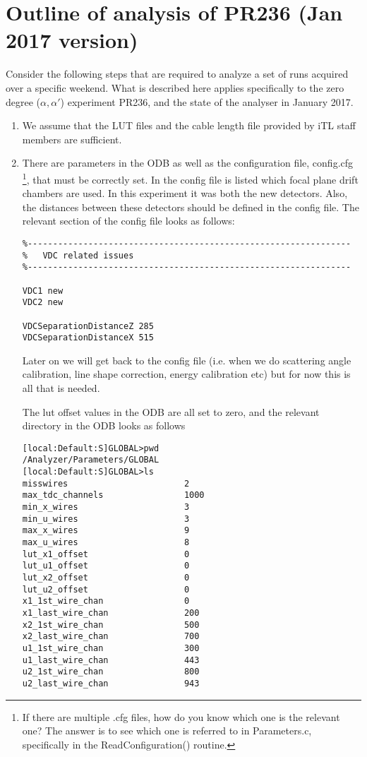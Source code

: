 \documentclass[11pt]{report}
\begin{document}
\section{Outline of analysis of PR236 (Jan 2017 version)}

Consider the following steps that are required to analyze a set of runs acquired over a specific weekend.
What is described here applies specifically to the zero degree ($\alpha, \alpha '$) experiment PR236,
and the state of the analyser in January 2017.

\begin{enumerate}
\item 
We assume that the LUT files and the cable length file provided by iTL staff members are sufficient.
\item 
There are parameters in the ODB as well as the configuration file, config.cfg \footnote{If 
there are multiple .cfg files, how do you know which one is the relevant one? The answer
is to see which one is referred to in Parameters.c, specifically in the ReadConfiguration() routine.},
that must be correctly set.
In the config file is listed which focal plane drift chambers are used. In this experiment 
it was both the new detectors.
Also, the distances between these detectors should be defined in the config file. The relevant section 
of the config file looks as follows:

\begin{verbatim}
%----------------------------------------------------------------
% 	VDC related issues
%----------------------------------------------------------------

VDC1 new
VDC2 new

VDCSeparationDistanceZ 285
VDCSeparationDistanceX 515

\end{verbatim}

Later on we will get back to the config file
(i.e. when we do scattering angle calibration, line shape correction, energy calibration etc) 
but for now this is all that is needed.

The lut offset values in the ODB are all set to zero, and
the relevant directory in the ODB looks as follows
\begin{verbatim}
[local:Default:S]GLOBAL>pwd  
/Analyzer/Parameters/GLOBAL
[local:Default:S]GLOBAL>ls
misswires                       2
max_tdc_channels                1000
min_x_wires                     3
min_u_wires                     3
max_x_wires                     9
max_u_wires                     8
lut_x1_offset                   0
lut_u1_offset                   0
lut_x2_offset                   0
lut_u2_offset                   0
x1_1st_wire_chan                0
x1_last_wire_chan               200
x2_1st_wire_chan                500
x2_last_wire_chan               700
u1_1st_wire_chan                300
u1_last_wire_chan               443
u2_1st_wire_chan                800
u2_last_wire_chan               943
\end{verbatim}


\end{enumerate}
\end{document}
